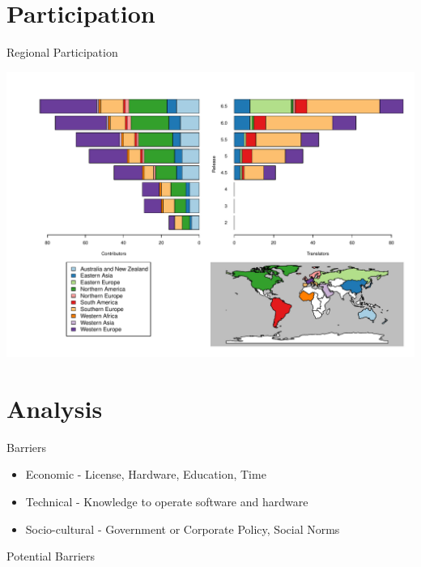 \documentclass{beamer}
\begin{document}
\section{Participation}
\begin{frame}{Regional Participation}
\vspace{-.3in}
	\begin{center}
		\includegraphics[width=1\textwidth]{RegionalParticipation.pdf}
		
	\end{center}
\end{frame}

\section{Analysis}

\begin{frame}{Barriers}
	\begin{itemize}
		\item Economic - License, Hardware, Education, Time
		\item Technical - Knowledge to operate software and hardware
		\item Socio-cultural - Government or Corporate Policy, Social Norms 
	\end{itemize}
\end{frame}

\begin{frame}{Potential Barriers}
\vspace{-.3in}
	\begin{center}
		\begin{scriptsize}
		\end{scriptsize}
	\end{center}
\end{frame}
\end{document}
